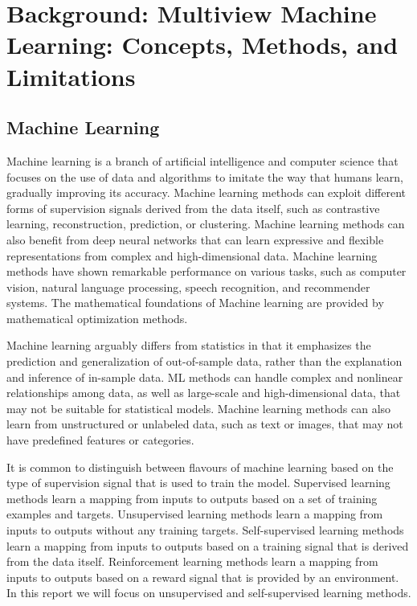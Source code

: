 \chapter{Background: Multiview Machine Learning: Concepts, Methods, and Limitations}
\label{chap:background}
\minitoc
\section{Machine Learning}

Machine learning is a branch of artificial intelligence and computer science that focuses on the use of data and algorithms to imitate the way that humans learn, gradually improving its accuracy. Machine learning methods can exploit different forms of supervision signals derived from the data itself, such as contrastive learning, reconstruction, prediction, or clustering. Machine learning methods can also benefit from deep neural networks that can learn expressive and flexible representations from complex and high-dimensional data. Machine learning methods have shown remarkable performance on various tasks, such as computer vision, natural language processing, speech recognition, and recommender systems. The mathematical foundations of Machine learning are provided by mathematical optimization methods.

Machine learning arguably differs from statistics in that it emphasizes the prediction and generalization of out-of-sample data, rather than the explanation and inference of in-sample data. ML methods can handle complex and nonlinear relationships among data, as well as large-scale and high-dimensional data, that may not be suitable for statistical models. Machine learning methods can also learn from unstructured or unlabeled data, such as text or images, that may not have predefined features or categories.

It is common to distinguish between flavours of machine learning based on the type of supervision signal that is used to train the model. Supervised learning methods learn a mapping from inputs to outputs based on a set of training examples and targets. Unsupervised learning methods learn a mapping from inputs to outputs without any training targets. Self-supervised learning methods learn a mapping from inputs to outputs based on a training signal that is derived from the data itself. Reinforcement learning methods learn a mapping from inputs to outputs based on a reward signal that is provided by an environment. In this report we will focus on unsupervised and self-supervised learning methods.

